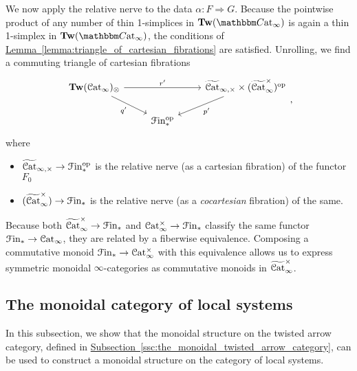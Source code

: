 \documentclass[main.tex]{subfiles}
\begin{document}
We now apply the relative nerve to the data $\alpha\colon F \Rightarrow G$. Because the pointwise product of any number of thin 1-simplices in $\Tw(\ICCat)$ is again a thin 1-simplex in $\Tw(\ICCat)$, the conditions of \hyperref[lemma:triangle_of_cartesian_fibrations]{Lemma~\ref*{lemma:triangle_of_cartesian_fibrations}} are satisfied. Unrolling, we find a commuting triangle of cartesian fibrations
\begin{equation}
  \label{eq:base_triangle}
  \begin{tikzcd}
    \Tw(\ICat)_{\otimes}
    \arrow[rr, "r'"]
    \arrow[dr, swap, "q'"]
    && \TICatCart \times (\TICatCocart)\op
    \arrow[dl, "p'"]
    \\
    & \Finp\op
  \end{tikzcd},
\end{equation}
where
\begin{itemize}
  \item $\widetilde{\mathcal{C}\mathrm{at}}_{\infty,\times} \to \mathcal{F}\mathrm{in}_{*}^{\mathrm{op}}$ is the relative nerve (as a cartesian fibration) of the functor $F_{0}$

  \item $(\widetilde{\mathcal{C}\mathrm{at}}_{\infty}^{\times}) \to \mathcal{F}\mathrm{in}_{*}$ is the relative nerve (as a \emph{cocartesian} fibration) of the same.
\end{itemize}

Because both $\widetilde{\mathcal{C}\mathrm{at}}_{\infty}^{\times} \to \mathcal{F}\mathrm{in}_{*}$ and $\mathcal{C}\mathrm{at}_{\infty}^{\times} \to \mathcal{F}\mathrm{in}_{*}$ classify the same functor $\mathcal{F}\mathrm{in}_{*} \to \mathcal{C}\mathrm{at}_{\infty}$, they are related by a fiberwise equivalence. Composing a commutative monoid $\mathcal{F}\mathrm{in}_{*} \to \mathcal{C}\mathrm{at}_{\infty}^{\times}$ with this equivalence allows us to express symmetric monoidal $\infty$-categories as commutative monoids in $\widetilde{\mathcal{C}\mathrm{at}}_{\infty}^{\times}$.

\subsection{The monoidal category of local systems}
\label{ssc:the_monoidal_category_of_local_systems}

In this subsection, we show that the monoidal structure on the twisted arrow category, defined in \hyperref[ssc:the_monoidal_twisted_arrow_category]{Subsection~\ref*{ssc:the_monoidal_twisted_arrow_category}}, can be used to construct a monoidal structure on the category of local systems.
\end{document}
